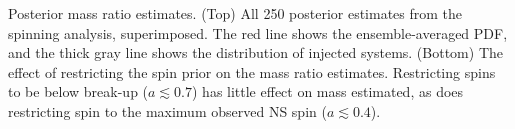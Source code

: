 Posterior mass ratio estimates.  (Top) All 250 posterior estimates from the spinning analysis, superimposed.  The red line shows the ensemble-averaged PDF, and the thick gray line shows the distribution of injected systems. (Bottom) The effect of restricting the spin prior on the mass ratio estimates.  Restricting spins to be below break-up ($a\lesssim0.7$) has little effect on mass estimated, as does restricting spin to the maximum observed NS spin ($a\lesssim0.4$).